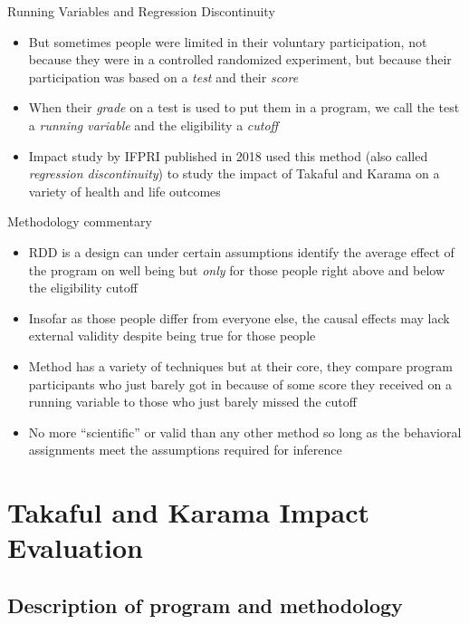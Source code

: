 \documentclass{beamer}
\begin{document}
\begin{frame}{Running Variables and Regression Discontinuity}
\begin{itemize}
\item But sometimes people were limited in their voluntary participation, not because they were in a controlled randomized experiment, but because their participation was based on a \emph{test} and their \emph{score}
\item When their \emph{grade} on a test is used to put them in a program, we call the test a \emph{running variable} and the eligibility a \emph{cutoff}
\item  Impact study by IFPRI published in 2018 used this method (also called \emph{regression discontinuity}) to study the impact of Takaful and Karama on a variety of health and life outcomes
\end{itemize}
\end{frame}

\begin{frame}{Methodology commentary}

\begin{itemize}
\item RDD is a design can under certain assumptions identify the average effect of the program on well being but \emph{only} for those people right above and below the eligibility cutoff
\item Insofar as those people differ from everyone else, the causal effects may lack external validity despite being true for those people
\item Method has a variety of techniques but at their core, they compare program participants who just barely got in because of some score they received on a running variable to those who just barely missed the cutoff
\item No more ``scientific'' or valid than any other method so long as the behavioral assignments meet the assumptions required for inference

\end{itemize}

\end{frame}


\section{Takaful and Karama Impact Evaluation}

\subsection{Description of program and methodology}
\end{document}
